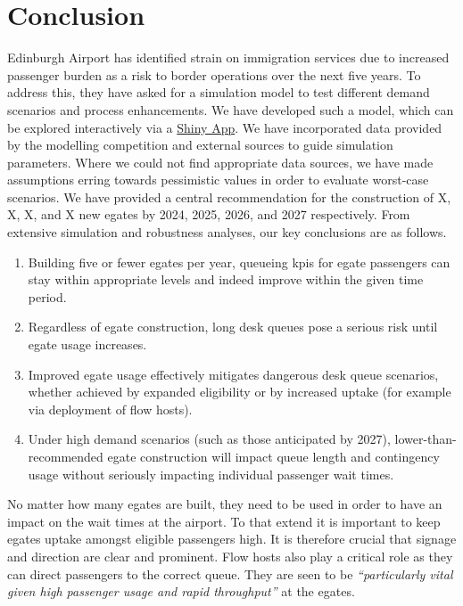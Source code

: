 \documentclass[10pt]{article}
\begin{document}
\section{Conclusion}
Edinburgh Airport has identified strain on immigration services due to increased passenger burden as a risk to border operations over the next five years. To address this, they have asked for a simulation model to test different demand scenarios and process enhancements. We have developed such a model, which can be explored interactively via a \href{app_url}{Shiny App}. We have incorporated data provided by the modelling competition and external sources to guide simulation parameters. Where we could not find appropriate data sources, we have made assumptions erring towards pessimistic values in order to evaluate worst-case scenarios. We have provided a central recommendation for the construction of X, X, X, and X new \glspl{egate} by 2024, 2025, 2026, and 2027 respectively. From extensive simulation and robustness analyses, our key conclusions are as follows.
\begin{enumerate}

    \item Building five or fewer \glspl{egate} per year, queueing \glspl{kpi} for \gls{egate} passengers can stay within appropriate levels and indeed improve within the given time period.
    \item Regardless of \gls{egate} construction, long desk queues pose a serious risk until \gls{egate} usage increases. 
    \item Improved \gls{egate} usage effectively mitigates dangerous desk queue scenarios, whether achieved by expanded eligibility or by increased uptake (for example via deployment of flow hosts).
    \item Under high demand scenarios (such as those anticipated by 2027), lower-than-recommended \gls{egate} construction will impact queue length and contingency usage without seriously impacting individual passenger wait times.
\end{enumerate}

No matter how many \glspl{egate} are built, they need to be used in order to have an impact on the wait times at the airport. To that extend it is important to keep \glspl{egate} uptake amongst eligible passengers high. It is therefore crucial that signage and direction are clear and prominent. Flow hosts also play a critical role as they can direct passengers to the correct queue. They are seen to be \textit{``particularly vital given high passenger usage and rapid throughput''} \cite[][paragraph 6.28]{Inspection_eGates} at the \glspl{egate}.
\end{document}
